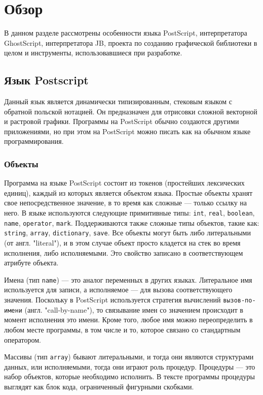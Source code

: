 \documentclass[14pt]{extarticle}
\begin{document}
	\pagebreak
	\section{Обзор}
	В данном разделе рассмотрены особенности языка PostScript, интерпретатора GhostScript, интерпретатора JB, проекта по созданию графической библиотеки в целом и инструменты, использовавшиеся при разработке.
	\subsection{Язык Postscript}
	Данный язык является динамически типизированным, стековым языком с обратной польской нотацией. Он предназначен для отрисовки сложной векторной и растровой графики. Программы на PostScript обычно создаются другими приложениями, но при этом на PostScript  можно писать как на обычном языке программирования. 
	
	\subsubsection*{Объекты}	
	Программа на языке PostScript состоит из токенов (простейших лексических единиц), каждый из которых является объектом языка. Простые объекты хранят свое непосредственное значение, в то время как сложные --- только ссылку на него. В языке используются следующие примитивные типы: \texttt{int}, \texttt{real}, \texttt{boolean}, \texttt{name}, \texttt{operator}, \texttt{mark}. Поддерживаются также сложные типы объектов, такие как: \texttt{string}, \texttt{array}, \texttt{dictionary}, \texttt{save}. Все объекты могут быть либо литеральными (от англ. "literal"), и в этом случае объект просто кладется на стек во время исполнения, либо исполняемыми. Это свойство записано в соответствующем атрибуте объекта. 
	
	 Имена (тип \texttt{name}) --- это аналог переменных в других языках. Литеральное имя используется для записи, а исполняемое --- для вызова соответствующего значения. Поскольку в PostScript используется стратегия вычислений \texttt{вызов-по-имени} (англ. "call-by-name"), то связывание имен со значением происходит в момент исполнения это имени. Кроме того, любое имя можно переопределить в любом месте программы, в том числе и то, которое связано со стандартным оператором. 
	 
	 Массивы (тип \texttt{array}) бывают литеральными, и тогда они являются структурами данных, или исполняемыми, тогда они играют роль процедур. Процедуры --- это набор объектов, которые необходимо исполнить. В тексте программы процедуры выглядят как блок кода, ограниченный фигурными скобками.
	 
\end{document}
